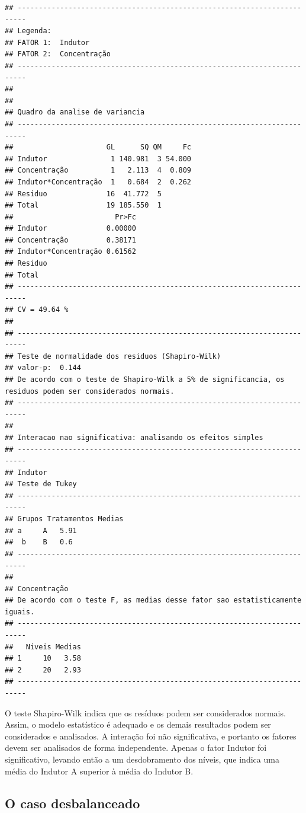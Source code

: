 \documentclass[
]{article}
\begin{document}
\begin{verbatim}
## ------------------------------------------------------------------------
## Legenda:
## FATOR 1:  Indutor 
## FATOR 2:  Concentração 
## ------------------------------------------------------------------------
## 
## 
## Quadro da analise de variancia
## ------------------------------------------------------------------------
##                      GL      SQ QM     Fc
## Indutor               1 140.981  3 54.000
## Concentração          1   2.113  4  0.809
## Indutor*Concentração  1   0.684  2  0.262
## Residuo              16  41.772  5       
## Total                19 185.550  1       
##                        Pr>Fc
## Indutor              0.00000
## Concentração         0.38171
## Indutor*Concentração 0.61562
## Residuo                     
## Total                       
## ------------------------------------------------------------------------
## CV = 49.64 %
## 
## ------------------------------------------------------------------------
## Teste de normalidade dos residuos (Shapiro-Wilk)
## valor-p:  0.144 
## De acordo com o teste de Shapiro-Wilk a 5% de significancia, os residuos podem ser considerados normais.
## ------------------------------------------------------------------------
## 
## Interacao nao significativa: analisando os efeitos simples
## ------------------------------------------------------------------------
## Indutor
## Teste de Tukey
## ------------------------------------------------------------------------
## Grupos Tratamentos Medias
## a     A   5.91 
##  b    B   0.6 
## ------------------------------------------------------------------------
## 
## Concentração
## De acordo com o teste F, as medias desse fator sao estatisticamente iguais.
## ------------------------------------------------------------------------
##   Niveis Medias
## 1     10   3.58
## 2     20   2.93
## ------------------------------------------------------------------------
\end{verbatim}

O teste Shapiro-Wilk indica que os resíduos podem ser considerados normais. Assim, o modelo estatístico é adequado e os demais resultados podem ser considerados e analisados. A interação foi não significativa, e portanto os fatores devem ser analisados de forma independente. Apenas o fator Indutor foi significativo, levando então a um desdobramento dos níveis, que indica uma média do Indutor A superior à média do Indutor B.

\hypertarget{o-caso-desbalanceado-2}{%
\subsection{O caso desbalanceado}\label{o-caso-desbalanceado-2}}
\end{document}

